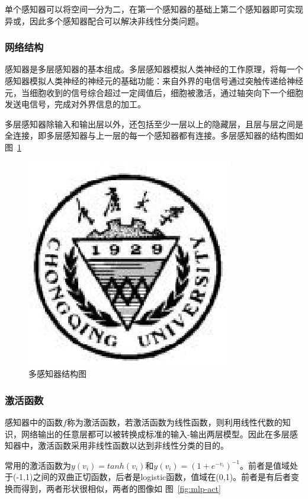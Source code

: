 \documentclass[bachelor,zhspacing]{cqu}  %
\begin{document}
单个感知器可以将空间一分为二，在第一个感知器的基础上第二个感知器即可实现异或，因此多个感知器配合可以解决非线性分类问题。

\subsubsection{网络结构}\label{ux7f51ux7edcux7ed3ux6784}

感知器是多层感知器的基本组成。多层感知器模拟人类神经的工作原理，将每一个感知器模拟人类神经的神经元的基础功能：来自外界的电信号通过突触传递给神经元，当细胞收到的信号综合超过一定阈值后，细胞被激活，通过轴突向下一个细胞发送电信号，完成对外界信息的加工。

多层感知器除输入和输出层以外，还包括至少一层以上的隐藏层，且层与层之间是全连接，即多层感知器与上一层的每一个感知器都有连接。多层感知器的结构图如
图~\ref{fig:mlp-con}

\begin{figure}[htbp]
\centering
\includegraphics{./pic/cqu.eps}
\caption{多感知器结构图}\label{fig:mlp-con}
\end{figure}

\subsubsection{激活函数}\label{ux6fc0ux6d3bux51fdux6570}

感知器中的函数\(f\)称为激活函数，若激活函数为线性函数，则利用线性代数的知识，网络输出的任意层都可以被转换成标准的输入-输出两层模型。因此在多层感知器中，激活函数采用非线性函数以达到非线性分类的目的。

常用的激活函数为\(y(v_{i}) = tanh(v_{i})\)和\(y(v_{i}) = (1+e^{-v_{i}})^{-1}\)。前者是值域处于(-1,1)之间的双曲正切函数，后者是logistic函数，值域在(0,1)。前者是有后者变换而得到，两者形状很相似，两者的图像如
图~\ref{fig:mlp-act}
\end{document}
